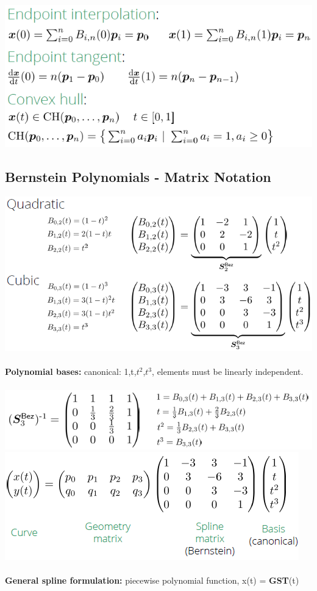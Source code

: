 \documentclass{article}
\begin{document}
\includegraphics[scale=0.5]{image67.png}

\subsection{Bernstein Polynomials - Matrix Notation}
\includegraphics[scale=0.6]{image69.png}\\\\
\textbf{Polynomial bases:} canonical: {1,t,$t^2$,$t^3$}, elements must be linearly independent. \\\\
\includegraphics[scale=0.6]{image70.png}\\
\includegraphics[scale=0.6]{image71.png}\\\\
\textbf{General spline formulation: }piecewise polynomial function, x(t) = \textbf{GST}(t)
\end{document}
